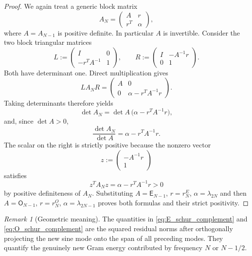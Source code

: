 \documentclass[preprint,12pt]{elsarticle}
\numberwithin{equation}{section}
\theoremstyle{plain}
\theoremstyle{definition}
\theoremstyle{remark}
\newtheorem{remark}[theorem]{Remark}
\newcommand{\E}{\mathsf E}
\newcommand{\Omat}{\mathsf O}
\begin{document}
\begin{proof}
We again treat a generic block matrix
\begin{equation}
A_N=\begin{pmatrix}A&r\\r^T&\alpha\end{pmatrix},
\end{equation}
where $A=A_{N-1}$ is positive definite.  In particular $A$ is invertible.  Consider the two block triangular matrices
\begin{equation}
L:=\begin{pmatrix}I&0\\-r^TA^{-1}&1\end{pmatrix},
\qquad
R:=\begin{pmatrix}I&-A^{-1}r\\0&1\end{pmatrix}.
\end{equation}
Both have determinant one.  Direct multiplication gives
\begin{equation}
LA_NR=
\begin{pmatrix}
A&0\\
0&\alpha-r^TA^{-1}r
\end{pmatrix}.
\end{equation}
Taking determinants therefore yields
\begin{equation}
\det A_N=\det A\,\bigl(\alpha-r^TA^{-1}r\bigr),
\end{equation}
and, since $\det A>0$,
\begin{equation}
\frac{\det A_N}{\det A}=\alpha-r^TA^{-1}r.
\end{equation}
The scalar on the right is strictly positive because the nonzero vector
\begin{equation}
z:=\begin{pmatrix}-A^{-1}r\\1\end{pmatrix}
\end{equation}
satisfies
\begin{equation}
z^TA_Nz=\alpha-r^TA^{-1}r>0
\end{equation}
by positive definiteness of $A_N$.  Substituting $A=\E_{N-1}$, $r=r_N^E$, $\alpha=\lambda_{2N}$ and then $A=\Omat_{N-1}$, $r=r_N^O$, $\alpha=\lambda_{2N-1}$ proves both formulas and their strict positivity.
\end{proof}

\begin{remark}[Geometric meaning]
\label{rem:schur_geometry}
The quantities in \eqref{eq:E_schur_complement} and \eqref{eq:O_schur_complement} are the squared residual norms after orthogonally projecting the new sine mode onto the span of all preceding modes. They quantify the genuinely new Gram energy contributed by frequency $N$ or $N-1/2$.
\end{remark}
\end{document}
